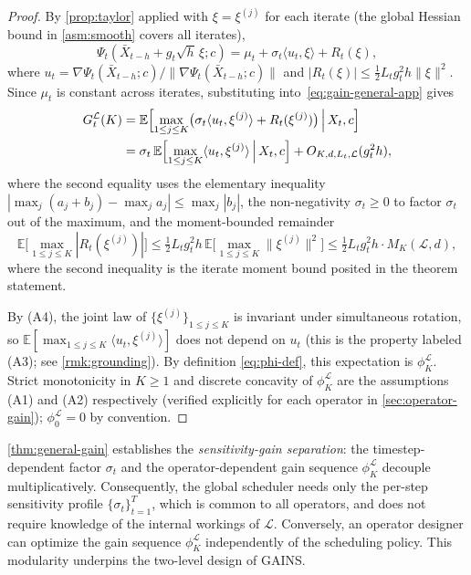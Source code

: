\begin{proof}
By \cref{prop:taylor} applied with $\xi = \xi^{(j)}$ for each iterate (the global Hessian bound in \cref{asm:smooth} covers all iterates),
\[
  \Psi_t(\bar{X}_{t-h} + g_t\sqrt{h}\,\xi; c) = \mu_t + \sigma_t \langle u_t, \xi\rangle + R_t(\xi),
\]
where $u_t = \nabla\Psi_t(\bar{X}_{t-h}; c) / \|\nabla\Psi_t(\bar{X}_{t-h}; c)\|$ and $|R_t(\xi)| \le \tfrac{1}{2}L_t g_t^2 h \|\xi\|^2$. Since $\mu_t$ is constant across iterates, substituting into~\cref{eq:gain-general-app} gives
\begin{align*}
  G_t^{\mathcal{L}}(K) &= \mathbb{E}\Bigl[\max_{1 \le j \le K}\bigl(\sigma_t \langle u_t, \xi^{(j)}\rangle + R_t(\xi^{(j)})\bigr)\,\Big|\,X_t, c\Bigr] \\
                       &= \sigma_t\,\mathbb{E}\Bigl[\max_{1 \le j \le K} \langle u_t, \xi^{(j)}\rangle\,\Big|\,X_t, c\Bigr] + O_{K,d,L_t,\mathcal{L}}(g_t^2 h),
\end{align*}
where the second equality uses the elementary inequality $|\max_j(a_j + b_j) - \max_j a_j| \le \max_j |b_j|$, the non-negativity $\sigma_t \ge 0$ to factor $\sigma_t$ out of the maximum, and the moment-bounded remainder
\[
  \mathbb{E}\bigl[\max_{1 \le j \le K} |R_t(\xi^{(j)})|\bigr] \le \tfrac{1}{2}L_t g_t^2 h\,\mathbb{E}\bigl[\max_{1 \le j \le K}\|\xi^{(j)}\|^2\bigr] \le \tfrac{1}{2}L_t g_t^2 h \cdot M_K(\mathcal{L}, d),
\]
where the second inequality is the iterate moment bound posited in the theorem statement.

By (A4), the joint law of $\{\xi^{(j)}\}_{1\le j\le K}$ is invariant under simultaneous rotation, so $\mathbb{E}[\max_{1 \le j \le K} \langle u_t, \xi^{(j)}\rangle]$ does not depend on $u_t$ (this is the property labeled (A3); see \cref{rmk:grounding}). By definition \cref{eq:phi-def}, this expectation is $\phi_K^{\mathcal{L}}$. Strict monotonicity in $K \ge 1$ and discrete concavity of $\phi_K^{\mathcal{L}}$ are the assumptions (A1) and (A2) respectively (verified explicitly for each operator in \cref{sec:operator-gain}); $\phi_0^{\mathcal{L}} = 0$ by convention.
\end{proof}
%
\begin{remark}
\label{rmk:separation}
\cref{thm:general-gain} establishes the \emph{sensitivity-gain separation}: the timestep-dependent factor $\sigma_t$ and the operator-dependent gain sequence $\phi_K^{\mathcal{L}}$ decouple multiplicatively. Consequently, the global scheduler needs only the per-step sensitivity profile $\{\sigma_t\}_{t=1}^T$, which is common to all operators, and does not require knowledge of the internal workings of $\mathcal{L}$. Conversely, an operator designer can optimize the gain sequence $\phi_K^{\mathcal{L}}$ independently of the scheduling policy. This modularity underpins the two-level design of \textsc{GAINS}.
\end{remark}
%
